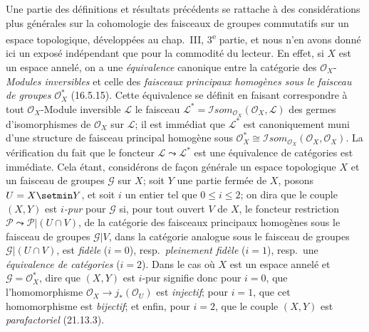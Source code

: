 \begin{remark}[21.13.13]
\label{IV.21.13.13}
Une partie des définitions et résultats précédents se rattache à des considérations
plus générales sur la cohomologie des faisceaux de groupes commutatifs sur un espace
topologique, développées au chap.~III, 3\textsuperscript{e} partie, et nous n'en avons
donné ici un exposé indépendant que pour la commodité du lecteur. En effet, si $X$
est un espace annelé, on a une \emph{équivalence} canonique entre la catégorie des
$\mathcal O_X$-\emph{Modules inversibles} et celle des \emph{faisceaux principaux homogènes
sous le faisceau de groupes} $\mathcal O_X^*$ (16.5.15). Cette équivalence se définit
en faisant correspondre à tout $\mathcal O_X$-Module inversible $\mathscr L$ le
faisceau $\mathscr L^*=\mathscr Isom_{\mathcal O_X}(\mathcal O_X,\mathscr L)$ des
germes d'isomorphismes de $\mathcal O_X$ sur $\mathscr L$; il est immédiat que
$\mathscr L^*$ est canoniquement muni d'une structure de faisceau principal homogène
sous $\mathcal O_X^*\cong\mathscr Isom_{\mathcal O_X}(\mathcal O_X,\mathcal O_X)$.
La vérification du fait que le foncteur $\mathscr L\leadsto\mathscr L^*$ est une
équivalence de catégories est immédiate.
Cela étant, considérons de façon générale un espace topologique $X$ et un faisceau de
groupes $\mathscr G$ sur $X$; soit $Y$ une partie fermée de $X$, posons $U=X\setmin Y$, et
soit $i$ un entier tel que $0\leq i\leq2$; on dira que le couple $(X,Y)$ est
\emph{$i$-pur} pour $\mathscr G$ si, pour tout ouvert $V$ de $X$, le foncteur
restriction $\mathscr P\leadsto\mathscr P|(U\cap V)$, de la catégorie des faisceaux
principaux homogènes sous le faisceau de groupes $\mathscr G|V$, dans la catégorie
analogue sous le faisceau de groupes $\mathscr G|(U\cap V)$, est \emph{fidèle}
($i=0$), resp.\ \emph{pleinement fidèle} ($i=1$), resp.\ une \emph{équivalence de
catégories} ($i=2$). Dans le cas où $X$ est un espace annelé et
$\mathscr G=\mathcal O_X^*$, dire que $(X,Y)$ est $i$-pur signifie donc pour $i=0$,
que l'homomorphisme $\mathcal O_X\to j_*(\mathcal O_U)$ est \emph{injectif}; pour
$i=1$, que cet homomorphisme est \emph{bijectif}; et enfin, pour $i=2$, que le couple
$(X,Y)$ est \emph{parafactoriel} (21.13.3).


\end{remark}
